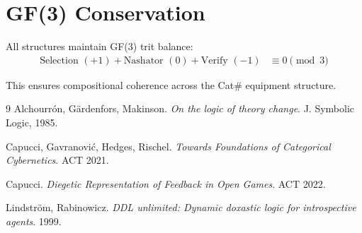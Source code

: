 \documentclass[11pt,a4paper]{article}
\begin{document}
\section{GF(3) Conservation}

All structures maintain GF(3) trit balance:
\begin{align}
\text{Selection } (+1) + \text{Nashator } (0) + \text{Verify } (-1) &\equiv 0 \pmod{3}
\end{align}

This ensures compositional coherence across the Cat\# equipment structure.


\begin{thebibliography}{9}
 Alchourrón, Gärdenfors, Makinson. 
\emph{On the logic of theory change}. J. Symbolic Logic, 1985.

 Capucci, Gavranović, Hedges, Rischel. 
\emph{Towards Foundations of Categorical Cybernetics}. ACT 2021.

 Capucci. 
\emph{Diegetic Representation of Feedback in Open Games}. ACT 2022.

 Lindström, Rabinowicz.
\emph{DDL unlimited: Dynamic doxastic logic for introspective agents}. 1999.
\end{thebibliography}
\end{document}
